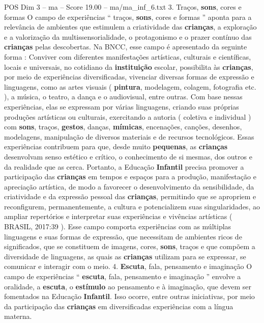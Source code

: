 \begin{textsample}{POS Dim 3 – ma – Score 19.00 – ma/ma\_inf\_6.txt}  \label{ex:f3_pos_146}
3.
Traços, \textbf{sons}, cores e formas O campo de experiências “ traços, \textbf{sons}, cores e formas ” aponta para a relevância de ambientes que estimulem a criatividade das \textbf{crianças}, a exploração e a valorização da multissensorialidade, o protagonismo e o prazer contínuo das \textbf{crianças} pelas descobertas.
Na BNCC, esse campo é apresentado da seguinte forma : Conviver com diferentes manifestações artísticas, culturais e científicas, locais e universais, no cotidiano da \textbf{instituição} escolar, possibilita às \textbf{crianças}, por meio de experiências diversificadas, vivenciar diversas formas de expressão e linguagens, como as artes visuais ( \textbf{pintura}, modelagem, colagem, fotografia etc. ), a música, o teatro, a dança e o audiovisual, entre outras.
Com base nessas experiências, elas se expressam por várias linguagens, criando suas próprias produções artísticas ou culturais, exercitando a autoria ( coletiva e individual ) com \textbf{sons}, traços, \textbf{gestos}, danças, \textbf{mímicas}, encenações, canções, desenhos, modelagens, manipulação de diversos materiais e de recursos tecnológicos.
Essas experiências contribuem para que, desde muito \textbf{pequenas}, as \textbf{crianças} desenvolvam senso estético e crítico, o conhecimento de si mesmas, dos outros e da realidade que as cerca.
Portanto, a Educação \textbf{Infantil} precisa promover a participação das \textbf{crianças} em tempos e espaços para a produção, manifestação e apreciação artística, de modo a favorecer o desenvolvimento da sensibilidade, da criatividade e da expressão pessoal das \textbf{crianças}, permitindo que se apropriem e reconfigurem, permanentemente, a cultura e potencializem suas singularidades, ao ampliar repertórios e interpretar suas experiências e vivências artísticas ( BRASIL, 2017:39 ).
Esse campo comporta experiências com as múltiplas linguagens e suas formas de expressão, que necessitam de ambientes ricos de significados, que se constituem de imagens, cores, \textbf{sons}, traços e que compõem a diversidade de linguagens, as quais as \textbf{crianças} utilizam para se expressar, se comunicar e interagir com o meio. 4. \textbf{Escuta}, fala, pensamento e imaginação O campo de experiências “ \textbf{escuta}, fala, pensamento e imaginação ” envolve a oralidade, a \textbf{escuta}, o \textbf{estímulo} ao pensamento e à imaginação, que devem ser fomentados na Educação \textbf{Infantil}.
Isso ocorre, entre outras iniciativas, por meio da participação das \textbf{crianças} em diversificadas experiências com a língua materna.

\end{textsample}
